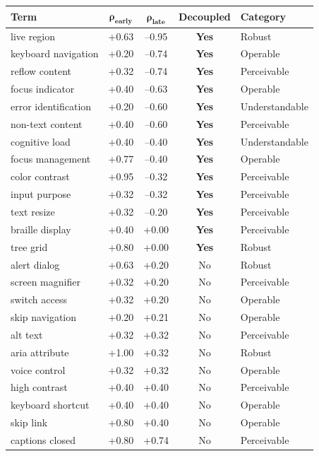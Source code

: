 \documentclass[10pt]{article} %
\begin{document}
\begin{table}[H]
\centering
\scriptsize
\begin{tabular}{|l|c|c|c|l|}
\hline
\textbf{Term} & $\mathbf{\rho_\text{early}}$ & $\mathbf{\rho_\text{late}}$ & \textbf{Decoupled} & \textbf{Category} \\
\hline
live region & +0.63 & --0.95 & \textbf{Yes} & Robust \\
keyboard navigation & +0.20 & --0.74 & \textbf{Yes} & Operable \\
reflow content & +0.32 & --0.74 & \textbf{Yes} & Perceivable \\
focus indicator & +0.40 & --0.63 & \textbf{Yes} & Operable \\
error identification & +0.20 & --0.60 & \textbf{Yes} & Understandable \\
non-text content & +0.40 & --0.60 & \textbf{Yes} & Perceivable \\
cognitive load & +0.40 & --0.40 & \textbf{Yes} & Understandable \\
focus management & +0.77 & --0.40 & \textbf{Yes} & Operable \\
color contrast & +0.95 & --0.32 & \textbf{Yes} & Perceivable \\
input purpose & +0.32 & --0.32 & \textbf{Yes} & Perceivable \\
text resize & +0.32 & --0.20 & \textbf{Yes} & Perceivable \\
braille display & +0.40 & +0.00 & \textbf{Yes} & Perceivable \\
tree grid & +0.80 & +0.00 & \textbf{Yes} & Robust \\
alert dialog & +0.63 & +0.20 & No & Robust \\
screen magnifier & +0.32 & +0.20 & No & Perceivable \\
switch access & +0.32 & +0.20 & No & Operable \\
skip navigation & +0.20 & +0.21 & No & Operable \\
alt text & +0.32 & +0.32 & No & Perceivable \\
aria attribute & +1.00 & +0.32 & No & Robust \\
voice control & +0.32 & +0.32 & No & Operable \\
high contrast & +0.40 & +0.40 & No & Perceivable \\
keyboard shortcut & +0.40 & +0.40 & No & Operable \\
skip link & +0.80 & +0.40 & No & Operable \\
captions closed & +0.80 & +0.74 & No & Perceivable \\

\end{tabular}
\end{table}
\end{document}
